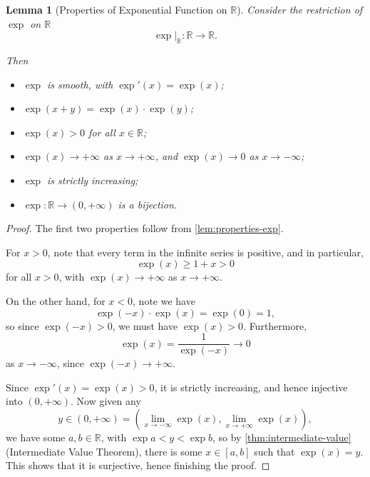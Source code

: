 \documentclass[11pt]{article}
\numberwithin{equation}{section}
\newtheorem{lemma}[theorem]{Lemma}
\theoremstyle{definition}
\theoremstyle{remark}
\newcommand{\pqty}[1]{\left(#1\right)}
\newcommand{\ccintv}[2]{[#1,#2]}
\newcommand{\oointv}[2]{(#1,#2)}
\newcommand{\functiondomain}[3]{#1:#2\to #3}
\newcommand{\RR}{\mathbb R}
\newcommand{\plusinfty}{+\infty}
\newcommand{\minusinfty}{-\infty}
\newcommand{\rightbar}[1]{\left.#1\right|}
\begin{document}
\begin{lemma}[Properties of Exponential Function on \(\RR\)]\label{analysis-unit-0220}
    \label{lem:properties-exp-r}%
    Consider the restriction of \(\exp\) on \(\RR\)
    \[
        \functiondomain{\rightbar{\exp}_{\RR}}{\RR}{\RR}.
    \]

    Then
    \begin{itemize}
        \item \(\exp\) is smooth, with \(\exp'\pqty{x} = \exp\pqty{x}\);
        \item \(\exp\pqty{x + y} = \exp\pqty{x} \cdot \exp\pqty{y}\);
        \item \(\exp\pqty{x} > 0\) for all \(x \in \RR\);
        \item \(\exp \pqty{x} \to \plusinfty\) as \(x \to \plusinfty\), and \(\exp(x)\to0\) as \(x\to-\infty\);
        \item \(\exp\) is strictly increasing;
        \item \(\functiondomain{\exp}{\RR}{\oointv{0}{\plusinfty}}\) is a bijection.
    \end{itemize}
\end{lemma}

\begin{proof}
    The first two properties follow from \autoref{lem:properties-exp}.

    For \(x > 0\), note that every term in the infinite series is positive, and in particular,
    \[
        \exp\pqty{x} \geq 1 + x > 0
    \]
    for all \(x > 0\), with \(\exp\pqty{x} \to \plusinfty\) as \(x \to \plusinfty\).

    On the other hand, for \(x < 0\), note we have
    \[
        \exp\pqty{-x} \cdot \exp\pqty{x} = \exp\pqty{0} = 1,
    \]
    so since \(\exp\pqty{-x} > 0\), we must have \(\exp\pqty{x} > 0\). Furthermore,
    \[
        \exp\pqty{x} = \frac{1}{\exp\pqty{-x}} \to 0
    \]
    as \(x \to \minusinfty\), since \(\exp\pqty{-x} \to \plusinfty\).

    Since \(\exp'\pqty{x} = \exp\pqty{x} > 0\), it is strictly increasing, and hence injective into \(\oointv{0}{\plusinfty}\). Now given any
    \[
        y \in \oointv{0}{\plusinfty} = \oointv{\lim_{x \to \minusinfty} \exp\pqty{x}}{\lim_{x \to \plusinfty} \exp\pqty{x}},
    \]
    we have some \(a, b \in \RR\), with \(\exp a < y < \exp b\), so by \autoref{thm:intermediate-value} (Intermediate Value Theorem), there is some \(x \in \ccintv{a}{b}\) such that \(\exp\pqty{x} = y\). This shows that it is surjective, hence finishing the proof.
\end{proof}
\end{document}

